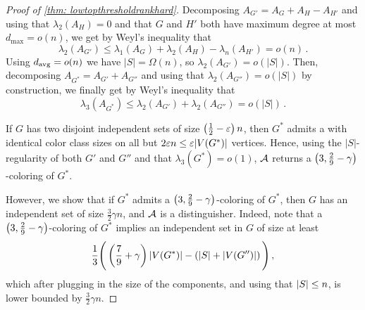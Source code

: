 \begin{proof}[Proof of \cref{thm: lowtopthresholdrankhard}]
    Decomposing $A_{G'}=A_G+A_H-A_{H'}$ and using that $\lambda_2(A_H) = 0$ and that $G$ and $H'$ both have maximum degree at most $d_{\max} = o(n)$, we get by  Weyl's inequality that
    \[\lambda_2(A_{G'}) \leq \lambda_1(A_G)+\lambda_2(A_H)-\lambda_n(A_{H'}) = o(n)\,.\]
    Using $d_{\operatorname{avg}}=o(n)$ we have $|S| = \Omega(n)$, so $\lambda_2(A_{G'}) = o(|S|)$. Then, decomposing $A_{G^*}=A_{G'}+A_{G''}$ and using that $\lambda_2(A_{G''})=o(|S|)$ by construction, we finally get by Weyl's inequality that
    \[\lambda_3(A_{G^*}) \leq \lambda_2(A_{G'})+\lambda_2(A_{G''}) =o(|S|)\,.\]

    If $G$ has two disjoint independent sets of size $\left(\frac{1}{2}-\varepsilon\right)n$, then $G^*$ admits a \tcl with identical color class sizes on all but $2\varepsilon n \leq \varepsilon |V(G^*)|$ vertices.
    Hence, using the $|S|$-regularity of both $G'$ and $G''$ and that $\lambda_3(G^*)=o(1)$, $\mathcal{A}$ returns a $\left(3, \frac{2}{9}-\gamma\right)$-coloring of $G^*$.

    However, we show that if $G^*$ admits a $\left(3, \frac{2}{9}-\gamma\right)$-coloring of $G^*$, then $G$ has an independent set of size $\frac{3}{2}\gamma n$, and $\mathcal{A}$ is a distinguisher.
    Indeed, note that a $\left(3, \frac{2}{9}-\gamma\right)$-coloring of $G^*$ implies an independent set in $G$ of size at least
    $$\frac{1}{3}\Bigg(\left(\frac{7}{9}+\gamma\right)\left\lvert V(G^*)\right\rvert-\left(\left\lvert S\right\rvert+|V(G'')|\right)\Bigg)\,,$$
    which after plugging in the size of the components, and using that $\left\lvert S\right\rvert\leq n$, is lower bounded by $\frac{3}{2} \gamma n$.
\end{proof}
